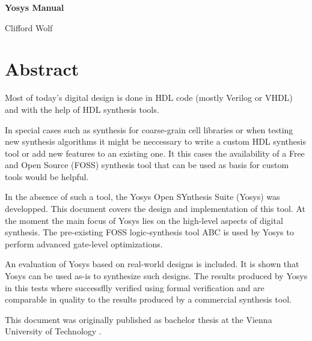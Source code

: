 \documentclass[oneside,a4paper]{book}
\begin{document}
\pagestyle{mypagestyle}

\thispagestyle{empty}
\null\vfil

\begin{center}
\bf\Huge Yosys Manual

\bigskip
\large Clifford Wolf
\end{center}

\vfil\null
\eject

\chapter*{Abstract}
Most of today's digital design is done in HDL code (mostly Verilog or VHDL) and
with the help of HDL synthesis tools.

In special cases such as synthesis for coarse-grain cell libraries or when
testing new synthesis algorithms it might be neccessary to write a custom HDL
synthesis tool or add new features to an existing one. It this cases the
availability of a Free and Open Source (FOSS) synthesis tool that can be used
as basis for custom tools would be helpful.

In the absence of such a tool, the Yosys Open SYnthesis Suite (Yosys) was
developped. This document covers the design and implementation of this tool.
At the moment the main focus of Yosys lies on the high-level aspects of
digital synthesis. The pre-existing FOSS logic-synthesis tool ABC is used
by Yosys to perform advanced gate-level optimizations.

An evaluation of Yosys based on real-world designs is included. It is shown
that Yosys can be used as-is to synthesize such designs. The results produced
by Yosys in this tests where successflly verified using formal verification
and are comparable in quality to the results produced by a commercial
synthesis tool.

\bigskip

This document was originally published as bachelor thesis at the Vienna
University of Technology \cite{BACC}.
\end{document}
